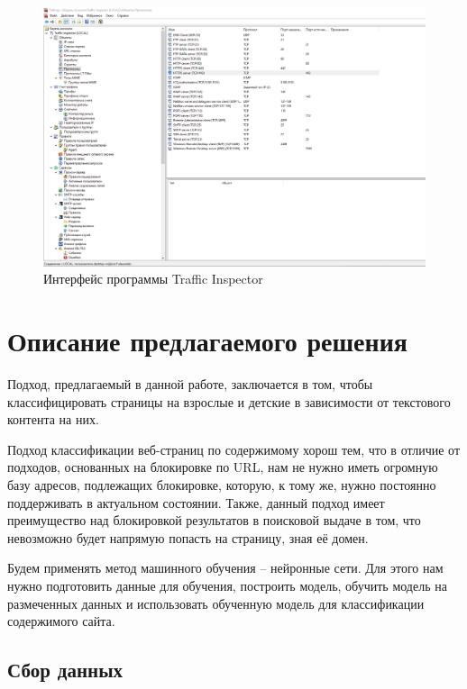 \documentclass[14pt]{matmex-diploma}
\begin{document}
    \begin{figure}[h]
        \centering
    	\includegraphics[scale=0.4]{images/bad_interface.png}
    	\caption{Интерфейс программы Traffic Inspector}
    	\label{bad}
    \end{figure}

\section{Описание предлагаемого решения}

    Подход, предлагаемый в данной работе, заключается в том, чтобы классифицировать страницы на взрослые и детские в зависимости
    от текстового контента на них.
    
    Подход классификации веб-страниц по содержимому хорош тем, что в отличие от подходов, основанных на блокировке по URL,
    нам не нужно иметь огромную базу адресов, подлежащих блокировке, которую, к тому же, нужно постоянно поддерживать в актуальном
    состоянии. Также, данный подход имеет преимущество над блокировкой результатов в поисковой выдаче в том, что невозможно будет 
    напрямую попасть на страницу, зная её домен.
    
    Будем применять метод машинного обучения – нейронные сети. Для этого нам нужно
    подготовить данные для обучения, построить модель, обучить модель на размеченных данных и использовать 
    обученную модель для классификации содержимого сайта.
    
    \subsection{Сбор данных} 
    
\end{document}
